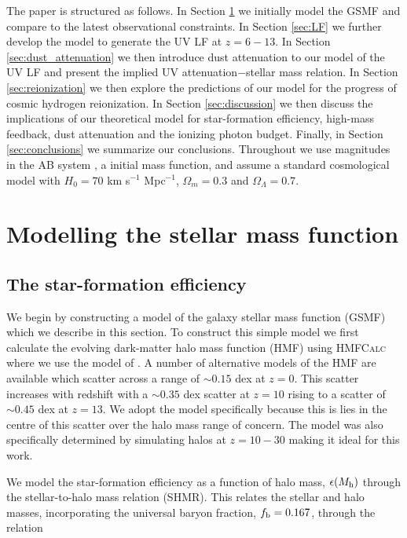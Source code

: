 \documentclass[fleqn,usenatbib]{mnras}
\begin{document}
The paper is structured as follows. In Section \ref{sec:GSMF} we initially model the GSMF and compare to the latest observational constraints. In Section \ref{sec:LF} we further develop the model to generate the UV LF at $z=6-13$. In Section \ref{sec:dust_attenuation} we then introduce dust attenuation to our model of the UV LF and present the implied UV attenuation$-$stellar mass relation. In Section \ref{sec:reionization} we then explore the predictions of our model for the progress of cosmic hydrogen reionization. In Section \ref{sec:discussion} we then discuss the implications of our theoretical model for star-formation efficiency, high-mass feedback, dust attenuation and the ionizing photon budget. Finally, in Section \ref{sec:conclusions} we summarize our conclusions. Throughout we use magnitudes in the AB system \citep{oke1974,oke1983}, a \citet{chabrier2003} initial mass function, and assume a standard cosmological model with $H_0=70$ km s$^{-1}$ Mpc$^{-1}$, $\Omega_m=0.3$ and $\Omega_{\Lambda}=0.7$.  



\section{Modelling the stellar mass function}
\label{sec:GSMF}
\subsection{The star-formation efficiency}
We begin by constructing a model of the galaxy stellar mass function (GSMF) which we describe in this section. 
To construct this simple model we first calculate the evolving dark-matter halo mass function (HMF) using \textsc{HMFCalc} \citep{murray2013} where we use the model of \citet{reed2007}. A number of alternative models of the HMF are available which scatter across a range of $\sim0.15$ dex at $z=0$. This scatter increases with redshift with a $\sim0.35$ dex scatter at $z=10$ rising to a scatter of  $\sim0.45$ dex at $z=13$. We adopt the \citet{reed2007} model specifically because this is lies in the centre of this scatter over the halo mass range of concern. The \citet{reed2007} model was also specifically determined by simulating halos at $z=10-30$ making it ideal for this work. 

We model the star-formation efficiency as a function of halo mass, $\epsilon(M_{\rm h})$ through the stellar-to-halo mass relation (SHMR). This relates the stellar and halo masses, incorporating the universal baryon fraction, $f_{\rm b}=0.167$, through the relation
\end{document}
